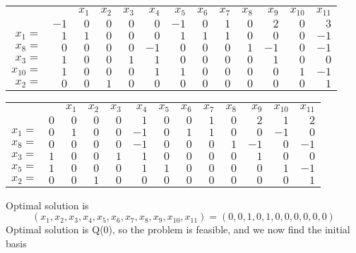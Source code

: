 \documentclass{article}
\theoremstyle{definition}
\begin{document}
\begin{table}[H]
  \begin{tabular}{r|r|rrrrrrrrrrr|}
  \cline{2-13}
    &   & $x_1$ & $x_2$ & $x_3$ & $x_4$ & $x_5$ & $x_6$ & $x_7$ & $x_8$ & $x_9$ & $x_10$ & $x_11$ \\ \cline{2-13}
    & $-1$ & $0$ & $0$ & $0$ & $0$ & $-1$ & $0$ & $1$ & $0$ & $2$ & $0$ & $3$ \\ \cline{2-13}
  $x_1 = $ & $1$ & $1$ & $0$ & $0$ & $0$ & $1$ & $1$ & $1$ & $0$ & $0$ & $0$ & $-1$ \\ 
  $x_8 = $ & $0$ & $0$ & $0$ & $0$ & $-1$ & $0$ & $0$ & $0$ & $1$ & $-1$ & $0$ & $-1$ \\ 
  $x_3 = $ & $1$ & $0$ & $0$ & $1$ & $1$ & $0$ & $0$ & $0$ & $0$ & $1$ & $0$ & $0$ \\ 
  $x_10 = $ & $1$ & $0$ & $0$ & $0$ & $1$ & $1$ & $0$ & $0$ & $0$ & $0$ & $1$ & $-1$ \\ 
  $x_2 = $ & $0$ & $0$ & $1$ & $0$ & $0$ & $0$ & $0$ & $0$ & $0$ & $0$ & $0$ & $1$ \\ \cline{2-13}
  \end{tabular}
\end{table}
\egroup
\bgroup
\def\arraystretch{1.5}
\begin{table}[H]
  \begin{tabular}{r|r|rrrrrrrrrrr|}
  \cline{2-13}
    &   & $x_1$ & $x_2$ & $x_3$ & $x_4$ & $x_5$ & $x_6$ & $x_7$ & $x_8$ & $x_9$ & $x_10$ & $x_11$ \\ \cline{2-13}
    & $0$ & $0$ & $0$ & $0$ & $1$ & $0$ & $0$ & $1$ & $0$ & $2$ & $1$ & $2$ \\ \cline{2-13}
  $x_1 = $ & $0$ & $1$ & $0$ & $0$ & $-1$ & $0$ & $1$ & $1$ & $0$ & $0$ & $-1$ & $0$ \\ 
  $x_8 = $ & $0$ & $0$ & $0$ & $0$ & $-1$ & $0$ & $0$ & $0$ & $1$ & $-1$ & $0$ & $-1$ \\ 
  $x_3 = $ & $1$ & $0$ & $0$ & $1$ & $1$ & $0$ & $0$ & $0$ & $0$ & $1$ & $0$ & $0$ \\ 
  $x_5 = $ & $1$ & $0$ & $0$ & $0$ & $1$ & $1$ & $0$ & $0$ & $0$ & $0$ & $1$ & $-1$ \\ 
  $x_2 = $ & $0$ & $0$ & $1$ & $0$ & $0$ & $0$ & $0$ & $0$ & $0$ & $0$ & $0$ & $1$ \\ \cline{2-13}
  \end{tabular}
\end{table}
\egroup
Optimal solution is
\[
  (x_1, x_2, x_3, x_4, x_5, x_6, x_7, x_8, x_9, x_10, x_11) = (0, 0, 1, 0, 1, 0, 0, 0, 0, 0, 0)
\]
Optimal solution is Q(0), so the problem is feasible, and we now find the initial basis
\end{document}
